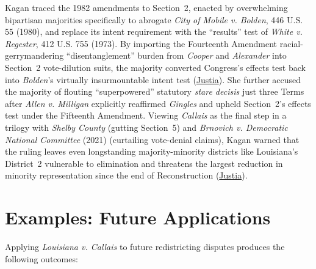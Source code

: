 \documentclass[12pt]{article}
\begin{document}
Kagan traced the 1982 amendments to Section~2, enacted by overwhelming bipartisan majorities specifically to abrogate \textit{City of Mobile v. Bolden}, 446 U.S. 55 (1980), and replace its intent requirement with the ``results'' test of \textit{White v. Regester}, 412 U.S. 755 (1973). By importing the Fourteenth Amendment racial-gerrymandering ``disentanglement'' burden from \textit{Cooper} and \textit{Alexander} into Section~2 vote-dilution suits, the majority converted Congress's effects test back into \textit{Bolden}'s virtually insurmountable intent test (\href{https://supreme.justia.com/cases/federal/us/608/24-109/}{Justia}). She further accused the majority of flouting ``superpowered'' statutory \textit{stare decisis} just three Terms after \textit{Allen v. Milligan} explicitly reaffirmed \textit{Gingles} and upheld Section~2's effects test under the Fifteenth Amendment. Viewing \textit{Callais} as the final step in a trilogy with \textit{Shelby County} (gutting Section~5) and \textit{Brnovich v. Democratic National Committee} (2021) (curtailing vote-denial claims), Kagan warned that the ruling leaves even longstanding majority-minority districts like Louisiana's District~2 vulnerable to elimination and threatens the largest reduction in minority representation since the end of Reconstruction (\href{https://supreme.justia.com/cases/federal/us/608/24-109/}{Justia}).

\section{Examples: Future Applications}

Applying \textit{Louisiana v. Callais} to future redistricting disputes produces the following outcomes:
\end{document}
